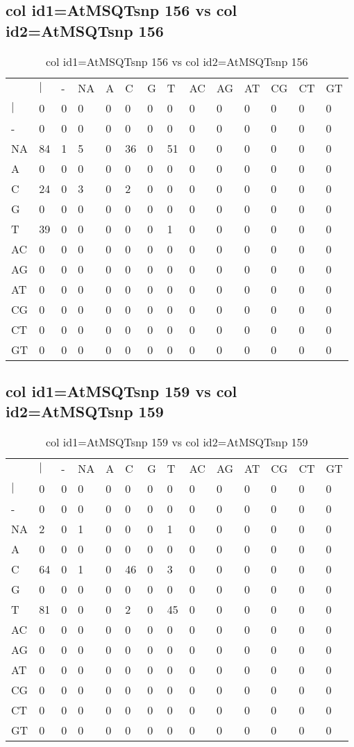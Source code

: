 \subsection{col id1=AtMSQTsnp 156 vs col id2=AtMSQTsnp 156}
\begin{center}
\begin{longtable}{|l|l|l|l|l|l|l|l|l|l|l|l|l|l|}
\caption{col id1=AtMSQTsnp 156 vs col id2=AtMSQTsnp 156} \label{table_dm542}\\
\hline
\\
\hline
&$|$&-&NA&A&C&G&T&AC&AG&AT&CG&CT&GT\\
$|$&0&0&0&0&0&0&0&0&0&0&0&0&0\\
-&0&0&0&0&0&0&0&0&0&0&0&0&0\\
NA&84&1&5&0&36&0&51&0&0&0&0&0&0\\
A&0&0&0&0&0&0&0&0&0&0&0&0&0\\
C&24&0&3&0&2&0&0&0&0&0&0&0&0\\
G&0&0&0&0&0&0&0&0&0&0&0&0&0\\
T&39&0&0&0&0&0&1&0&0&0&0&0&0\\
AC&0&0&0&0&0&0&0&0&0&0&0&0&0\\
AG&0&0&0&0&0&0&0&0&0&0&0&0&0\\
AT&0&0&0&0&0&0&0&0&0&0&0&0&0\\
CG&0&0&0&0&0&0&0&0&0&0&0&0&0\\
CT&0&0&0&0&0&0&0&0&0&0&0&0&0\\
GT&0&0&0&0&0&0&0&0&0&0&0&0&0\\
\hline
\end{longtable}
\end{center}

\subsection{col id1=AtMSQTsnp 159 vs col id2=AtMSQTsnp 159}
\begin{center}
\begin{longtable}{|l|l|l|l|l|l|l|l|l|l|l|l|l|l|}
\caption{col id1=AtMSQTsnp 159 vs col id2=AtMSQTsnp 159} \label{table_dm544}\\
\hline
\\
\hline
&$|$&-&NA&A&C&G&T&AC&AG&AT&CG&CT&GT\\
$|$&0&0&0&0&0&0&0&0&0&0&0&0&0\\
-&0&0&0&0&0&0&0&0&0&0&0&0&0\\
NA&2&0&1&0&0&0&1&0&0&0&0&0&0\\
A&0&0&0&0&0&0&0&0&0&0&0&0&0\\
C&64&0&1&0&46&0&3&0&0&0&0&0&0\\
G&0&0&0&0&0&0&0&0&0&0&0&0&0\\
T&81&0&0&0&2&0&45&0&0&0&0&0&0\\
AC&0&0&0&0&0&0&0&0&0&0&0&0&0\\
AG&0&0&0&0&0&0&0&0&0&0&0&0&0\\
AT&0&0&0&0&0&0&0&0&0&0&0&0&0\\
CG&0&0&0&0&0&0&0&0&0&0&0&0&0\\
CT&0&0&0&0&0&0&0&0&0&0&0&0&0\\
GT&0&0&0&0&0&0&0&0&0&0&0&0&0\\
\hline
\end{longtable}
\end{center}

